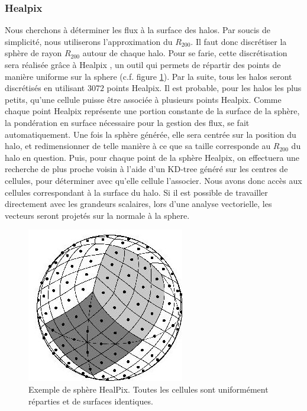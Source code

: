 \subsubsection{Healpix}
\label{sec:healpix}

Nous cherchons à déterminer les flux à la surface des halos.
Par soucis de simplicité, nous utiliserons l'approximation du $R_{200}$.
Il faut donc discrétiser la sphère de rayon $R_{200}$ autour de chaque halo.
Pour se farie, cette discrétisation sera réalisée grâce à Healpix \citep{gorski_healpix:_2005}, un outil qui permets de répartir des points de manière uniforme sur la sphere (c.f. figure \ref{fig:HealPix}).
Par la suite, tous les halos seront discrétisés en utilisant $3072$ points Healpix.
Il est probable, pour les halos les plus petits, qu'une cellule puisse être associée à plusieurs points Healpix.
Comme chaque point Healpix représente une portion constante de la surface de la sphère, la pondération en surface nécessaire pour la gestion des flux, se fait automatiquement.
Une fois la sphère générée, elle sera centrée sur la position du halo, et redimensionner de telle manière à ce que sa taille corresponde au $R_{200}$ du halo en question.
Puis, pour chaque point de la sphère Healpix, on effectuera une recherche de plus proche voisin à l'aide d'un KD-tree généré sur les centres de cellules, pour déterminer avec qu'elle cellule l'associer.
Nous avons donc accès aux cellules correspondant à la surface du halo.
Si il est possible de travailler directement avec les grandeurs scalaires, lors d'une analyse vectorielle, les vecteurs seront projetés sur la normale à la sphere.


\begin{figure}
	\centering
    \includegraphics[width=.45\linewidth]{img/03/healpix.jpg} 
    \caption[Sphère HealPix]{Exemple de sphère HealPix. Toutes les cellules sont uniformément réparties et de surfaces identiques.}
 	\label{fig:HealPix}
\end{figure}

